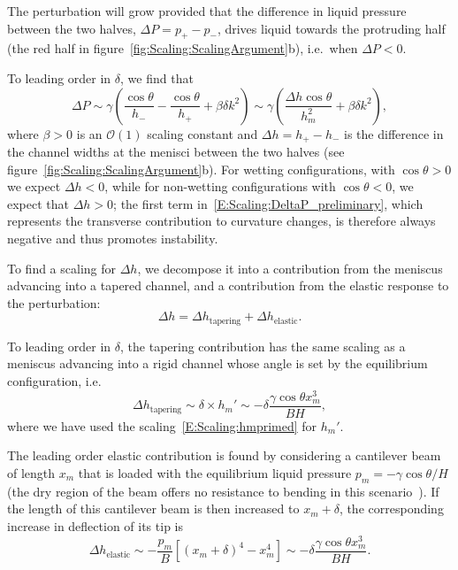 \documentclass{jfm}
\newcommand{\amplitude}{\delta} %
\begin{document}
The perturbation will grow provided that the difference in liquid pressure between the two halves, $\Delta P = p_+ - p_-$, drives liquid towards the protruding half (the red half in figure~\ref{fig:Scaling:ScalingArgument}b), i.e.~when $\Delta P<0$.

To leading order in $\amplitude$, we find that
\begin{equation}\label{E:Scaling:DeltaP_preliminary}
\Delta P\sim \gamma\left(\frac{\cos \theta}{h_-} - \frac{ \cos \theta}{h_+} + \beta \amplitude k^2\right) \sim \gamma \left(\frac{\Delta h \cos \theta}{h_m^2} + \beta \amplitude k^2\right),
\end{equation}
where $\beta>0$ is an $\mathcal{O}(1)$ scaling constant and $\Delta h = h_+ - h_- $ is the difference in the channel widths at the menisci between the two halves (see figure~\ref{fig:Scaling:ScalingArgument}b). For wetting configurations, with $\cos \theta > 0$ we expect $\Delta h < 0$, while for non-wetting configurations with $\cos \theta < 0$, we expect that $\Delta h > 0$; the first term in~\eqref{E:Scaling:DeltaP_preliminary}, which represents the transverse contribution to curvature changes, is therefore always negative and thus promotes instability.

To find a scaling for $\Delta h$, we decompose it into a contribution from the meniscus advancing into a tapered channel, and a contribution from the elastic response to the perturbation:
\begin{equation}\label{E:Scaling:ChangeInH}
\Delta h = \Delta h_\text{tapering} + \Delta h_\text{elastic}.
\end{equation}

To leading order in $\amplitude$, the tapering contribution has the same scaling as a meniscus advancing into a rigid channel whose angle is set by the equilibrium configuration, i.e.
\begin{equation}\label{E:ChangeInHtapering}
\Delta h_\text{tapering} \sim \amplitude  \times h_m' \sim -\delta \frac{\gamma  \cos \theta x_m^3}{B H},
\end{equation}
where we have used the scaling~\eqref{E:Scaling:hmprimed} for $h_m'$.

The leading order elastic contribution is found by considering a cantilever beam of length $x_m$ that is loaded with the equilibrium liquid pressure $p_m = -\gamma \cos \theta/H$ (the dry region of the beam offers no resistance to bending in this scenario~\citep{Bradley2019PRL}). If the length of this cantilever beam is then increased to $x_m + \delta$, the corresponding increase in deflection of its tip is
\begin{equation}\label{E:Scaling:ChangeInHelastic}
\Delta h_\text{elastic} \sim -\frac{p_m}{B}\left[ \left(x_m + \amplitude\right)^4 - x_m^4\right] \sim  -\amplitude \frac{\gamma \cos \theta x_m^3}{BH}.
\end{equation}
\end{document}
